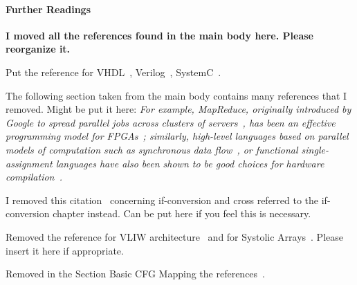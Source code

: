 \paragraph{Further Readings}
{\bf I moved all the references found in the main body here. Please reorganize it.}

Put the reference for VHDL~\cite{VHDLBook}, Verilog~\cite{VerilogBook}, SystemC~\cite{SystemC:ISSS01}.



The following section taken from the main body contains many references that I removed. Might be put it here: {\em 
For example, MapReduce, originally introduced by Google to spread parallel 
jobs across clusters of servers~\cite{Dean:CACM08}, has been an effective 
programming model for FPGAs~\cite{Yeung:FCCM08}; similarly, high-level 
languages based on parallel models of computation such as synchronous data 
flow~\cite{Lee:ProcIEEE87}, or functional single-assignment languages have 
also been shown to be good choices for hardware 
compilation~\cite{Hormati:CASES08,Hagiescu:DAC09,SAC:IJS02}.}

I removed this citation~\cite{Allen:POPL83} concerning if-conversion and cross referred to the if-conversion chapter instead. Can be put here if you feel this is necessary.

Removed the reference for VLIW architecture~\cite{Fisher:2005:Book} and for Systolic Arrays~\cite{CompilingSystolicArraysBook}. Please insert it here if appropriate.

Removed in the Section Basic CFG Mapping the references~\cite{Hormati:CASES08,Kaplan:DAC03}.




